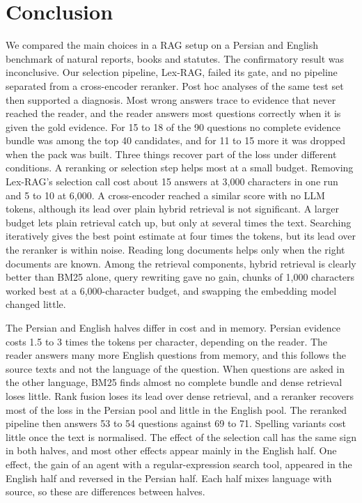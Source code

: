\section{Conclusion}
\label{sec:conclusion}

We compared the main choices in a RAG setup on a Persian and English benchmark of natural reports, books and statutes. The confirmatory result was inconclusive. Our selection pipeline, Lex-RAG, failed its gate, and no pipeline separated from a cross-encoder reranker. Post hoc analyses of the same test set then supported a diagnosis. Most wrong answers trace to evidence that never reached the reader, and the reader answers most questions correctly when it is given the gold evidence. For 15 to 18 of the 90 questions no complete evidence bundle was among the top 40 candidates, and for 11 to 15 more it was dropped when the pack was built. Three things recover part of the loss under different conditions. A reranking or selection step helps most at a small budget. Removing Lex-RAG's selection call cost about 15 answers at 3,000 characters in one run and 5 to 10 at 6,000. A cross-encoder reached a similar score with no LLM tokens, although its lead over plain hybrid retrieval is not significant. A larger budget lets plain retrieval catch up, but only at several times the text. Searching iteratively gives the best point estimate at four times the tokens, but its lead over the reranker is within noise. Reading long documents helps only when the right documents are known. Among the retrieval components, hybrid retrieval is clearly better than BM25 alone, query rewriting gave no gain, chunks of 1,000 characters worked best at a 6,000-character budget, and swapping the embedding model changed little.

The Persian and English halves differ in cost and in memory. Persian evidence costs 1.5 to 3 times the tokens per character, depending on the reader. The reader answers many more English questions from memory, and this follows the source texts and not the language of the question. When questions are asked in the other language, BM25 finds almost no complete bundle and dense retrieval loses little. Rank fusion loses its lead over dense retrieval, and a reranker recovers most of the loss in the Persian pool and little in the English pool. The reranked pipeline then answers 53 to 54 questions against 69 to 71. Spelling variants cost little once the text is normalised. The effect of the selection call has the same sign in both halves, and most other effects appear mainly in the English half. One effect, the gain of an agent with a regular-expression search tool, appeared in the English half and reversed in the Persian half. Each half mixes language with source, so these are differences between halves.

